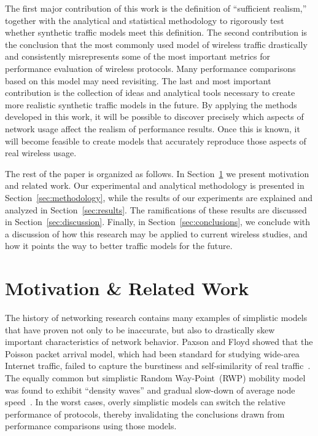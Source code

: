 \documentclass[conference]{IEEEtran}
\newcommand{\caps}[1]{{\small{#1}}}
\begin{document}
The first major contribution of this work is the definition of ``sufficient realism,'' together with the analytical and statistical methodology to rigorously test whether synthetic traffic models meet this definition. The second contribution is the conclusion that the most commonly used model of wireless traffic drastically and consistently misrepresents some of the most important metrics for performance evaluation of wireless protocols. Many performance comparisons based on this model may need revisiting. The last and most important contribution is the collection of ideas and analytical tools necessary to create more realistic synthetic traffic models in the future. By applying the methods developed in this work, it will be possible to discover precisely which aspects of network usage affect the realism of performance results. Once this is known, it will become feasible to create models that accurately reproduce those aspects of real wireless usage.

The rest of the paper is organized as follows. In Section~\ref{sec:motivation} we present motivation and related work. Our experimental and analytical methodology is presented in Section~\ref{sec:methodology}, while the results of our experiments are explained and analyzed in Section~\ref{sec:results}. The ramifications of these results are discussed in Section~\ref{sec:discussion}. Finally, in Section~\ref{sec:conclusions}, we conclude with a discussion of how this research may be applied to current wireless studies, and how it points the way to better traffic models for the future.

\section{Motivation \& Related Work}\label{sec:motivation}\label{sec:related-work}

The history of networking research contains many examples of simplistic models that have proven not only to be inaccurate, but also to drastically skew important characteristics of network behavior. Paxson and Floyd showed that the Poisson packet arrival model, which had been standard for studying wide-area Internet traffic, failed to capture the burstiness and self-similarity of real traffic~\cite{Paxson95}. The equally common but simplistic Random Way-Point~(\caps{RWP}) mobility model was found to exhibit ``density waves'' and gradual slow-down of average node speed~\cite{Royer01,Yoon03:speed-decay}. In the worst cases, overly simplistic models can switch the relative performance of protocols, thereby invalidating the conclusions drawn from performance comparisons using those models.
\end{document}
